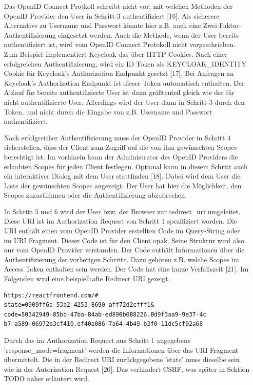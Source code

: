 Das OpenID Connect Protkoll schreibt nicht vor, mit welchen Methoden der OpenID Provider den User in Schritt 3 authentifiziert [16]. Als sicherere Alternative zu Username und Passwort könnte hier z.B. auch eine Zwei-Faktor-Authentifizierung eingesetzt werden. Auch die Methode, wenn der User bereits authentifiziert ist, wird vom OpenID Connect Protokoll nicht vorgeschrieben. Zum Beispiel implementiert Keycloak das über HTTP Cookies. Nach einer erfolgreichen Authentifizierung, wird ein ID Token als KEYCLOAK\_IDENTITY Cookie für Keycloak's Authorization Endpunkt gesetzt [17]. Bei Anfragen an Keycloak's Authorization Endpunkt ist dieser Token automatisch enthalten. Der Ablauf für bereits authentifizierte User ist dann größtenteil gleich wie der für nicht authentifizierte User. Allerdings wird der User dann in Schritt 3 durch den Token, und nicht durch die Eingabe von z.B. Username und Passwort authentifiziert.

Nach erfolgreicher Authentifizierung muss der OpenID Provider in Schritt 4 sicherstellen, dass der Client zum Zugriff auf die von ihm gewünschten Scopes berechtigt ist. Im vorhinein kann der Administrator des OpenID Providers die erlaubten Scopes für jeden Client festlegen. Optional kann in diesem Schritt auch ein interaktiver Dialog mit dem User stattfinden [18]. Dabei wird dem User die Liste der gewünschten Scopes angezeigt. Der User hat hier die Möglichkeit, den Scopes zuzustimmen oder die Authentifizierung abzubrechen.

In Schritt 5 und 6 wird der User bzw. der Browser zur redirect\_uri umgeleitet. Diese URI ist im Authorization Request von Schritt 1 spezifiziert worden. Die URI enthält einen vom OpenID Provider erstellten Code im Query-String oder im URI Fragment. Dieser Code ist für den Client opak. Seine Struktur wird also nur vom OpenID Provider verstanden. Der Code enthält Informationen über die Authentifizierung der vorherigen Schritte. Dazu gehören z.B. welche Scopes im Access Token enthalten sein werden. Der Code hat eine kurze Verfallszeit [21]. Im Folgenden wird eine beispielhafte Redirect URI gezeigt.

\begin{lstlisting}[caption=Beispiel Redirect URI, captionpos=b, label=EBBeispielRedirectURI]
https://reactfrontend.com/#
state=0909ff6a-53b2-4253-8690-aff72d2cfff1&
code=50342949-85bb-47ba-84ab-ed890b088226.0d9f3aa9-9e37-4c
b7-a589-06972b3cf410.ef40a086-7a64-4b49-b3f0-11dc5cf92a68
\end{lstlisting}

Durch das im Authorization Request aus Schritt 1 angegebene 'response\_mode=fragment' werden die Informationen über das URI Fragment übermittelt. Die in der Redirect URI zurückgegebene 'state' muss dieselbe sein wie in der Autorization Request [20]. Das verhindert CSRF, was später in Sektion TODO näher erläutert wird.

